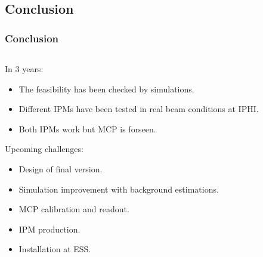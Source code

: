 \subsection{Conclusion}
\begin{frame}[t]
  \frametitle{Conclusion}
    \begin{columns}[T]
      \begin{column}{0.45\textwidth}
        \begin{block}{In 3 years:}
          \begin{itemize}
            \item[\checkmark] The feasibility has been checked by simulations.
            \item[\checkmark] Different IPMs have been tested in real beam conditions at IPHI.
            \item[\checkmark] Both IPMs work but MCP is forseen.
          \end{itemize}
        \end{block}
        \begin{block}{Upcoming challenges:}
          \begin{itemize}
            \item Design of final version.
            \item Simulation improvement with background estimations.
            \item MCP calibration and readout.
            \item IPM production.
            \item Installation at ESS.
          \end{itemize}
        \end{block}
      \end{column}
      \begin{column}{0.45\textwidth}
      \end{column}
    \end{columns}


\end{frame}
